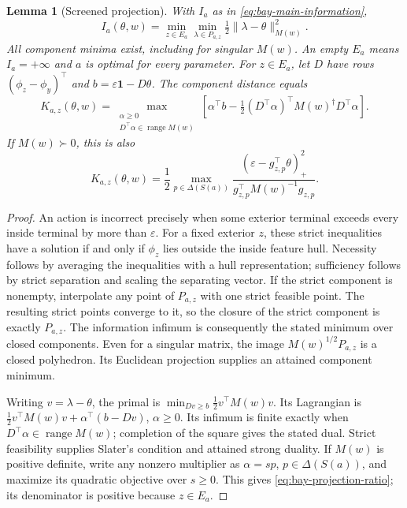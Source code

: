 \documentclass{article}
\theoremstyle{plain}
\newtheorem{lemma}[theorem]{Lemma}
\theoremstyle{definition}
\begin{document}
\begin{lemma}[Screened projection]
\label{lem:bay-projection}
With $I_a$ as in \cref{eq:bay-main-information},
\[
 I_a(\theta,w)=\min_{z\in E_a}
       \min_{\lambda\in P_{a,z}}
             \tfrac12\|\lambda-\theta\|_{M(w)}^2.
\]
All component minima exist, including for singular $M(w)$.
An empty $E_a$ means $I_a=+\infty$ and $a$ is optimal for every parameter.
For $z\in E_a$, let $D$ have rows $(\phi_z-\phi_y)^\top$ and
$b=\varepsilon\mathbf1-D\theta$.  The component distance equals
\[
 K_{a,z}(\theta,w)=
 \max_{\substack{\alpha\ge0\\D^\top\alpha\in\operatorname{range}M(w)}}
 \left[\alpha^\top b-\tfrac12(D^\top\alpha)^\top
                       M(w)^\dagger D^\top\alpha\right].
\]
If $M(w)\succ0$, this is also
\begin{equation}
 K_{a,z}(\theta,w)=\frac12\max_{p\in\Delta(S(a))}
       \frac{(\varepsilon-g_{z,p}^\top\theta)_+^2}
            {g_{z,p}^\top M(w)^{-1}g_{z,p}}.
 \label{eq:bay-projection-ratio}
\end{equation}
\end{lemma}
\begin{proof}
An action is incorrect precisely when some exterior terminal exceeds
every inside terminal by more than $\varepsilon$.  For a fixed exterior
$z$, these strict inequalities have a solution if and only if
$\phi_z$ lies outside the inside feature hull.  Necessity follows by
averaging the inequalities with a hull representation; sufficiency
follows by strict separation and scaling the separating vector.
If the strict component is nonempty, interpolate any point of $P_{a,z}$
with one strict feasible point.  The resulting strict points converge
to it, so the closure of the strict component is exactly $P_{a,z}$.
The information infimum is consequently the stated minimum over closed
components.  Even for a singular matrix, the image
$M(w)^{1/2}P_{a,z}$ is a closed polyhedron.  Its Euclidean projection
supplies an attained component minimum.

Writing $v=\lambda-\theta$, the primal is
$\min_{Dv\ge b}\tfrac12v^\top M(w)v$.  Its Lagrangian is
$\tfrac12v^\top M(w)v+\alpha^\top(b-Dv)$, $\alpha\ge0$.
Its infimum is finite exactly when $D^\top\alpha\in\operatorname{range}M(w)$;
completion of the square gives the stated dual.  Strict feasibility
supplies Slater's condition and attained strong duality.  If $M(w)$ is
positive definite, write any nonzero multiplier as $\alpha=sp$,
$p\in\Delta(S(a))$, and maximize its quadratic objective over $s\ge0$.
This gives \cref{eq:bay-projection-ratio}; its denominator is positive
because $z\in E_a$.
\end{proof}
\end{document}
